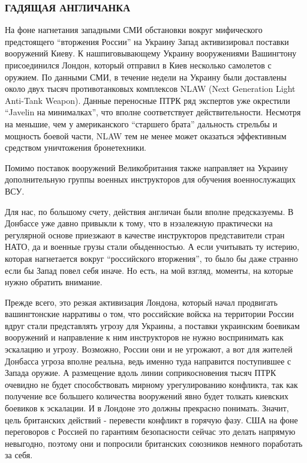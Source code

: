 \subsubsection{ГАДЯЩАЯ АНГЛИЧАНКА}

На фоне нагнетания западными СМИ обстановки вокруг мифического предстоящего
\enquote{вторжения России} на Украину Запад активизировал поставки вооружений Киеву. К
нашпиговывающему Украину вооружениями Вашингтону присоединился Лондон, который
отправил в Киев несколько самолетов с оружием. По данными СМИ, в течение недели
на Украину были доставлены около двух тысяч противотанковых комплексов NLAW
(Next Generation Light Anti-Tank Weapon). Данные переносные ПТРК ряд экспертов
уже окрестили \enquote{Javelin на минималках}, что вполне соответствует
действительности. Несмотря на меньшие, чем у американского \enquote{старшего брата}
дальность стрельбы и мощность боевой части, NLAW тем не менее может оказаться
эффективным средством уничтожения бронетехники.

Помимо поставок вооружений Великобритания также направляет на Украину
дополнительную группы военных инструкторов для обучения военнослужащих ВСУ.

Для нас, по большому счету, действия англичан были вполне предсказуемы. В
Донбассе уже давно привыкли к тому, что в нэзалежную практически на регулярной
основе приезжают в качестве инструкторов представители стран НАТО, да и военные
грузы стали обыденностью. А если учитывать ту истерию, которая нагнетается
вокруг \enquote{российского вторжения}, то было бы даже странно если бы Запад повел
себя иначе. Но есть, на мой взгляд, моменты, на которые нужно обратить
внимание.

Прежде всего, это резкая активизация Лондона, который начал продвигать
вашингтонские нарративы о том, что российские войска на территории России вдруг
стали представлять угрозу для Украины, а поставки украинским боевикам
вооружений и направление к ним инструкторов не нужно воспринимать как эскалацию
и угрозу. Возможно, России они и не угрожают, а вот для жителей Донбасса угроза
вполне реальна, ведь именно туда направится поступившее с Запада оружие. А
размещение вдоль линии соприкосновения тысяч ПТРК очевидно не будет
способствовать мирному урегулированию конфликта, так как получение все большего
количества вооружений явно будет толкать киевских боевиков к эскалации. И в
Лондоне это должны прекрасно понимать. Значит, цель британских действий -
перевести конфликт в горячую фазу. США на фоне переговоров с Россией по
гарантиям безопасности сейчас это делать напрямую невыгодно, поэтому они и
попросили британских союзников немного поработать за себя.


